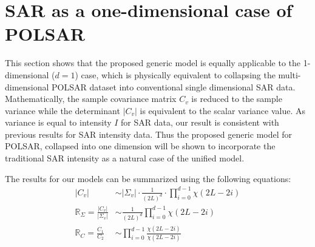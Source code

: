 \documentclass[journal]{IEEEtran}
\begin{document}
\section{SAR as a one-dimensional case of POLSAR}
\label{sec:sar_special_case_of_polsar}

This section shows that the proposed generic model is equally  applicable to the 1-dimensional ($d=1$) case,
  which is physically equivalent to  collapsing the multi-dimensional POLSAR dataset  into conventional single dimensional SAR data.
Mathematically, the sample covariance matrix $C_v$ is reduced to the sample variance while the determinant $|C_v|$ is equivalent to  the scalar variance value.
As variance is equal to intensity $I$ for SAR data, our result is consistent with previous results for SAR intensity data.
Thus the proposed generic model for POLSAR, collapsed into one dimension will be shown to incorporate the traditional SAR intensity as a natural case of the unified model.
  
The results for our models can be summarized using the following equations:
\begin{align*}
  |C_v| &\sim |\Sigma_v| \cdot \frac{1}{(2L)^d} \cdot \prod_{i=0}^{d-1} \chi (2L-2i) \\ %
  \mathbb{R}_{\Sigma} = \frac{|C_v|}{|\Sigma_v|} &\sim \frac{1}{(2L)^d} \prod^{d-1}_{i=0} \chi(2L-2i) \\ %
\mathbb{R}_{C} = \frac{C_1}{C_2} &\sim \prod_{i=0}^{d-1} \frac{\chi(2L-2i)}{\chi(2L-2i)}
\end{align*}
\end{document}
